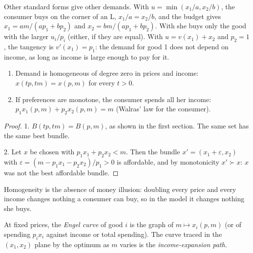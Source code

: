 Other standard forms give other demands. With 
$u = \min(x_1/a, x_2/b)$, the consumer buys on the corner of an L,
$x_1/a = x_2/b$, and the budget gives $x_1 = am/(ap_1 + bp_2)$ and
$x_2 = bm/(ap_1 + bp_2)$. With  she buys only the good
with the larger $u_i/p_i$ (either, if they are equal). With  $u = v(x_1) + x_2$ and $p_2 = 1$, the tangency is $v'(x_1) = p_1$: the
demand for good 1 does not depend on income, as long as income is large
enough to pay for it.

\begin{proposition}\label{prop:b1:consumer-choice:homogeneity}
\begin{enumerate}
  \item Demand is homogeneous of degree zero in prices and income:
    $x(tp, tm) = x(p, m)$ for every $t > 0$.
  \item If preferences are monotone, the consumer spends all her income:
    $p_1x_1(p, m) + p_2x_2(p, m) = m$ (Walras' law for the consumer).
\end{enumerate}
\end{proposition}

\begin{proof}
1. $B(tp, tm) = B(p, m)$, as shown in the first section. The same set has the
same best bundle.

2. Let $x$ be chosen with $p_1x_1 + p_2x_2 < m$. Then the bundle
$x' = (x_1 + \varepsilon, x_2)$ with
$\varepsilon = (m - p_1x_1 - p_2x_2)/p_1 > 0$ is affordable, and by monotonicity
$x' \succ x$: $x$ was not the best affordable bundle.
\end{proof}

Homogeneity is the absence of money illusion: doubling every price and
every income changes nothing a consumer can buy, so in the model it changes
nothing she buys.

\begin{definition}\label{def:b1:consumer-choice:engel-curve}
At fixed prices, the \emph{Engel curve} of good $i$ is the graph of
$m \mapsto x_i(p, m)$ (or of spending $p_ix_i$ against income or total
spending). The curve traced in the $(x_1, x_2)$ plane by the optimum as $m$
varies is the \emph{income-expansion path}.
\end{definition}

